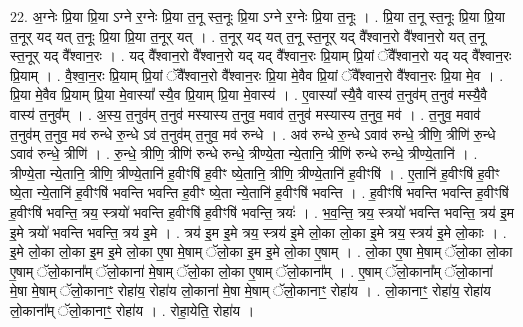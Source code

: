 \documentclass[17pt]{extarticle}
\begin{document}
22. अ॒ग्नेः प्रि॒या प्रि॒या ऽग्ने र॒ग्नेः प्रि॒या त॒नू स्त॒नूः प्रि॒या ऽग्ने र॒ग्नेः प्रि॒या त॒नूः । . प्रि॒या त॒नू स्त॒नूः प्रि॒या प्रि॒या त॒नूर् यद् यत् त॒नूः प्रि॒या प्रि॒या त॒नूर् यत् । . त॒नूर् यद् यत् त॒नू स्त॒नूर् यद् वै᳚श्वान॒रो वै᳚श्वान॒रो यत् त॒नू स्त॒नूर् यद् वै᳚श्वान॒रः । . यद् वै᳚श्वान॒रो वै᳚श्वान॒रो यद् यद् वै᳚श्वान॒रः प्रि॒याम् प्रि॒यां ॅवै᳚श्वान॒रो यद् यद् वै᳚श्वान॒रः प्रि॒याम् । . वै॒श्वा॒न॒रः प्रि॒याम् प्रि॒यां ॅवै᳚श्वान॒रो वै᳚श्वान॒रः प्रि॒या मे॒वैव प्रि॒यां ॅवै᳚श्वान॒रो वै᳚श्वान॒रः प्रि॒या मे॒व । . प्रि॒या मे॒वैव प्रि॒याम् प्रि॒या मे॒वास्या᳚ स्यै॒व प्रि॒याम् प्रि॒या मे॒वास्य॑ । . ए॒वास्या᳚ स्यै॒वै वास्य॑ त॒नुव॑म् त॒नुव॑ मस्यै॒वै वास्य॑ त॒नुव᳚म् । . अ॒स्य॒ त॒नुव॑म् त॒नुव॑ मस्यास्य त॒नुव॒ मवाव॑ त॒नुव॑ मस्यास्य त॒नुव॒ मव॑ । . त॒नुव॒ मवाव॑ त॒नुव॑म् त॒नुव॒ मव॑ रुन्धे रु॒न्धे ऽव॑ त॒नुव॑म् त॒नुव॒ मव॑ रुन्धे । . अव॑ रुन्धे रु॒न्धे ऽवाव॑ रुन्धे॒ त्रीणि॒ त्रीणि॑ रु॒न्धे ऽवाव॑ रुन्धे॒ त्रीणि॑ । . रु॒न्धे॒ त्रीणि॒ त्रीणि॑ रुन्धे रुन्धे॒ त्रीण्ये॒ता न्ये॒तानि॒ त्रीणि॑ रुन्धे रुन्धे॒ त्रीण्ये॒तानि॑ । . त्रीण्ये॒ता न्ये॒तानि॒ त्रीणि॒ त्रीण्ये॒तानि॑ ह॒वीꣳषि॑ ह॒वीꣳ ष्ये॒तानि॒ त्रीणि॒ त्रीण्ये॒तानि॑ ह॒वीꣳषि॑ । . ए॒तानि॑ ह॒वीꣳषि॑ ह॒वीꣳ ष्ये॒ता न्ये॒तानि॑ ह॒वीꣳषि॑ भवन्ति भवन्ति ह॒वीꣳ ष्ये॒ता न्ये॒तानि॑ 
ह॒वीꣳषि॑ भवन्ति । . ह॒वीꣳषि॑ भवन्ति भवन्ति ह॒वीꣳषि॑ ह॒वीꣳषि॑ भवन्ति॒ त्रय॒ स्त्रयो॑ भवन्ति ह॒वीꣳषि॑ ह॒वीꣳषि॑ भवन्ति॒ त्रयः॑ । . भ॒व॒न्ति॒ त्रय॒ स्त्रयो॑ भवन्ति भवन्ति॒ त्रय॑ इ॒म इ॒मे त्रयो॑ भवन्ति भवन्ति॒ त्रय॑ इ॒मे । . त्रय॑ इ॒म इ॒मे त्रय॒ स्त्रय॑ इ॒मे लो॒का लो॒का इ॒मे त्रय॒ स्त्रय॑ इ॒मे लो॒काः । . इ॒मे लो॒का लो॒का इ॒म इ॒मे लो॒का ए॒षा मे॒षाम् ॅलो॒का इ॒म इ॒मे लो॒का ए॒षाम् । . लो॒का ए॒षा मे॒षाम् ॅलो॒का लो॒का ए॒षाम् ॅलो॒काना᳚म् ॅलो॒काना॑ मे॒षाम् ॅलो॒का लो॒का ए॒षाम् ॅलो॒काना᳚म् । . ए॒षाम् ॅलो॒काना᳚म् ॅलो॒काना॑ मे॒षा मे॒षाम् ॅलो॒कानाꣳ॒॒ रोहा॑य॒ रोहा॑य लो॒काना॑ मे॒षा मे॒षाम् ॅलो॒कानाꣳ॒॒ रोहा॑य । . लो॒कानाꣳ॒॒ रोहा॑य॒ रोहा॑य लो॒काना᳚म् ॅलो॒कानाꣳ॒॒ रोहा॑य । . रोहा॒येति॒ रोहा॑य । \newline
\pagebreak
{}
\end{document}
